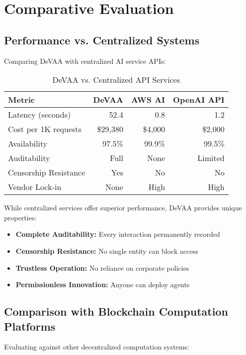 \section{Comparative Evaluation}

\subsection{Performance vs. Centralized Systems}

Comparing DeVAA with centralized AI service APIs:

\begin{table}[h!]
\centering
\caption{DeVAA vs. Centralized API Services}
\label{tab:centralized-comparison}
\begin{tabular}{lrrr}
\toprule
\textbf{Metric} & \textbf{DeVAA} & \textbf{AWS AI} & \textbf{OpenAI API} \\
\midrule
Latency (seconds) & 52.4 & 0.8 & 1.2 \\
Cost per 1K requests & \$29,380 & \$4,000 & \$2,000 \\
Availability & 97.5\% & 99.9\% & 99.5\% \\
Auditability & Full & None & Limited \\
Censorship Resistance & Yes & No & No \\
Vendor Lock-in & None & High & High \\
\bottomrule
\end{tabular}
\end{table}

While centralized services offer superior performance, DeVAA provides unique properties:
\begin{itemize}
    \item \textbf{Complete Auditability:} Every interaction permanently recorded
    \item \textbf{Censorship Resistance:} No single entity can block access
    \item \textbf{Trustless Operation:} No reliance on corporate policies
    \item \textbf{Permissionless Innovation:} Anyone can deploy agents
\end{itemize}

\subsection{Comparison with Blockchain Computation Platforms}

Evaluating against other decentralized computation systems:

